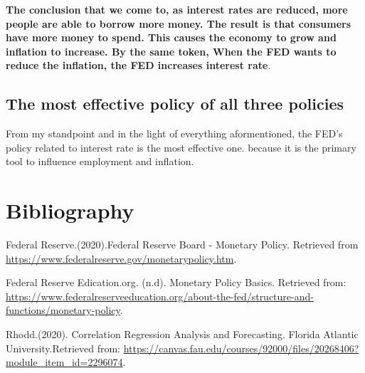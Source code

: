 \documentclass[
]{article}
\begin{document}
\textbf{The conclusion that we come to, as interest rates are reduced,
more people are able to borrow more money. The result is that consumers
have more money to spend. This causes the economy to grow and inflation
to increase. By the same token, When the FED wants to reduce the
inflation, the FED increases interest rate}.

\hypertarget{the-most-effective-policy-of-all-three-policies}{%
\subsection{The most effective policy of all three
policies}\label{the-most-effective-policy-of-all-three-policies}}

From my standpoint and in the light of everything aformentioned, the
FED's policy related to interest rate is the most effective one. because
it is the primary tool to influence employment and inflation.

\hypertarget{bibliography}{%
\section{Bibliography}\label{bibliography}}

Federal Reserve.(2020).Federal Reserve Board - Monetary Policy.
Retrieved from \url{https://www.federalreserve.gov/monetarypolicy.htm}.

Federal Reserve Edication.org. (n.d). Monetary Policy Basics. Retrieved
from:
\url{https://www.federalreserveeducation.org/about-the-fed/structure-and-functions/monetary-policy}.

Rhodd.(2020). Correlation Regression Analysis and Forecasting. Florida
Atlantic University.Retrieved from:
\url{https://canvas.fau.edu/courses/92000/files/20268406?module_item_id=2296074}.
\end{document}
